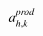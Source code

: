 

    \[\let\par\empty

    
{{{{\miitalic{a}}}\sb{{{\miitalic{h}}{\miitalic{,}}{\miitalic{k}}}}\sp{{\miitalic{prod}}}}}


    \]

  